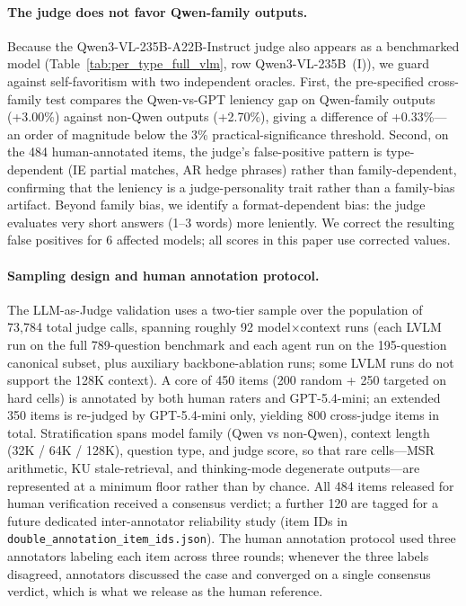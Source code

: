 \documentclass{article}
\begin{document}
\paragraph{The judge does not favor Qwen-family outputs.}
Because the Qwen3-VL-235B-A22B-Instruct judge also appears as a benchmarked model (Table~\ref{tab:per_type_full_vlm}, row Qwen3-VL-235B~(I)), we guard against self-favoritism with two independent oracles.
First, the pre-specified cross-family test compares the Qwen-vs-GPT leniency gap on Qwen-family outputs (+3.00\%) against non-Qwen outputs (+2.70\%), giving a difference of +0.33\%---an order of magnitude below the 3\% practical-significance threshold.
Second, on the 484 human-annotated items, the judge's false-positive pattern is type-dependent (IE partial matches, AR hedge phrases) rather than family-dependent, confirming that the leniency is a judge-personality trait rather than a family-bias artifact.
Beyond family bias, we identify a format-dependent bias: the judge evaluates very short answers (1--3 words) more leniently.
We correct the resulting false positives for 6 affected models; all scores in this paper use corrected values.

\paragraph{Sampling design and human annotation protocol.}
The LLM-as-Judge validation uses a two-tier sample over the population of 73{,}784 total judge calls, spanning roughly 92 model$\times$context runs (each LVLM run on the full 789-question benchmark and each agent run on the 195-question canonical subset, plus auxiliary backbone-ablation runs; some LVLM runs do not support the 128K context).
A core of 450 items (200 random + 250 targeted on hard cells) is annotated by both human raters and GPT-5.4-mini; an extended 350 items is re-judged by GPT-5.4-mini only, yielding 800 cross-judge items in total.
Stratification spans model family (Qwen vs non-Qwen), context length (32K / 64K / 128K), question type, and judge score, so that rare cells---MSR arithmetic, KU stale-retrieval, and thinking-mode degenerate outputs---are represented at a minimum floor rather than by chance.
All 484 items released for human verification received a consensus verdict; a further 120 are tagged for a future dedicated inter-annotator reliability study (item IDs in \texttt{double\_annotation\_item\_ids.json}).
The human annotation protocol used three annotators labeling each item across three rounds; whenever the three labels disagreed, annotators discussed the case and converged on a single consensus verdict, which is what we release as the human reference.
\end{document}
